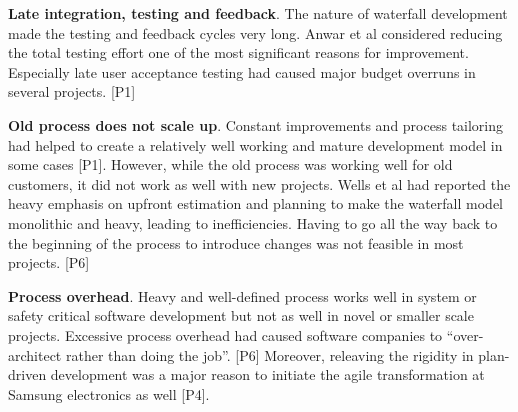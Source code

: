 {\bfseries Late integration, testing and feedback}. The nature of
waterfall development made the testing and feedback cycles very long.
Anwar et al considered reducing the total testing effort one of the most
significant reasons for improvement. Especially late user acceptance
testing had caused major budget overruns in several projects. [P1]

{\bfseries Old process does not scale up}. Constant improvements and
process tailoring had helped to create a relatively well working and
mature development model in some cases [P1]. However, while the old
process was working well for old customers, it did not work as well with
new projects. Wells et al had reported the heavy emphasis on upfront
estimation and planning to make the waterfall model monolithic and
heavy, leading to inefficiencies. Having to go all the way back to the
beginning of the process to introduce changes was not feasible in most
projects. [P6]

{\bfseries Process overhead}. Heavy and well-defined process works well
in system or safety critical software development but not as well in
novel or smaller scale projects. Excessive process overhead had caused software
companies to ``over-architect rather than doing the job''. [P6] Moreover,
releaving the rigidity in plan-driven development was a major reason to initiate
the agile transformation at Samsung electronics as well [P4].
